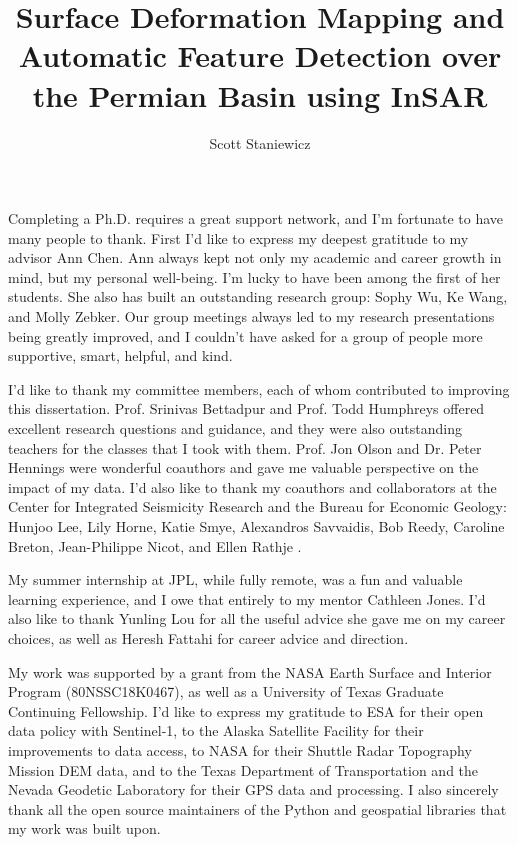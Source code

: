 \documentclass{utexasthesis}
\title{Surface Deformation Mapping and Automatic Feature Detection over the Permian Basin using InSAR}
\author{Scott Staniewicz}
\begin{document}
\maketitle

%


\begin{acknowledgments}

Completing a Ph.D. requires a great support network, and I'm fortunate to have many people to thank.
First I'd like to express my deepest gratitude to my advisor Ann Chen. 
Ann always kept not only my academic and career growth in mind, but my personal well-being. I'm lucky to have been among the first of her students. She also has built an outstanding research group: Sophy Wu, Ke Wang, and Molly Zebker. Our group meetings always led to my research presentations being greatly improved, and I couldn't have asked for a group of people more supportive, smart, helpful, and kind.

I'd like to thank my committee members, each of whom contributed to improving this dissertation. Prof. Srinivas Bettadpur and  Prof. Todd Humphreys offered excellent research questions and guidance, and they were also outstanding teachers for the classes that I took with them. Prof. Jon Olson and Dr. Peter Hennings were wonderful coauthors and gave me valuable perspective on the impact of my data.  I'd also like to thank my coauthors and collaborators at the Center for Integrated Seismicity Research and the Bureau for Economic Geology: Hunjoo Lee, Lily Horne, Katie Smye, Alexandros Savvaidis, Bob Reedy, Caroline Breton, Jean-Philippe Nicot, and Ellen Rathje .

My summer internship at JPL, while fully remote, was a fun and valuable learning experience, and I owe that entirely to my mentor Cathleen Jones. I'd also like to thank Yunling Lou for all the useful advice she gave me on my career choices, as well as Heresh Fattahi for career advice and direction.

My work was supported by a grant from the NASA Earth Surface and Interior Program (80NSSC18K0467), as well as a University of Texas Graduate Continuing Fellowship. I'd like to express my gratitude to ESA for their open data policy with Sentinel-1, to the Alaska Satellite Facility for their improvements to data access, to NASA for their Shuttle Radar Topography Mission DEM data, and to the Texas Department of Transportation and the Nevada Geodetic Laboratory for their GPS data and processing. I also sincerely thank all the open source maintainers of the Python and geospatial libraries that my work was built upon.



\end{acknowledgments}
\end{document}
